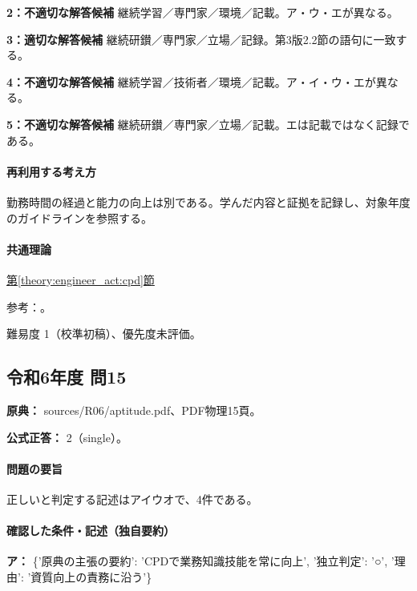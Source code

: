 \noindent\textbf{2：不適切な解答候補} 継続学習／専門家／環境／記載。ア・ウ・エが異なる。\par

\noindent\textbf{3：適切な解答候補} 継続研鑚／専門家／立場／記録。第3版2.2節の語句に一致する。\par

\noindent\textbf{4：不適切な解答候補} 継続学習／技術者／環境／記載。ア・イ・ウ・エが異なる。\par

\noindent\textbf{5：不適切な解答候補} 継続研鑚／専門家／立場／記載。エは記載ではなく記録である。\par

\paragraph{再利用する考え方} 勤務時間の経過と能力の向上は別である。学んだ内容と証拠を記録し、対象年度のガイドラインを参照する。

\paragraph{共通理論} \hyperref[theory:engineer_act:cpd]{第\ref*{theory:engineer_act:cpd}節}

\par 参考：\cite{cpd_v3}。

\par 難易度 1（校準初稿）、優先度未評価。

\subsection{令和6年度 問15}
\label{q:r06-reg-apt-15}

\noindent\textbf{原典：} sources/R06/aptitude.pdf、PDF物理15頁。

\textbf{公式正答：} 2（single）。

\paragraph{問題の要旨} 正しいと判定する記述はアイウオで、4件である。

\paragraph{確認した条件・記述（独自要約）}\mbox{}\par

\noindent\textbf{ア：} \{'原典の主張の要約': 'CPDで業務知識技能を常に向上', '独立判定': '○', '理由': '資質向上の責務に沿う'\}\par

